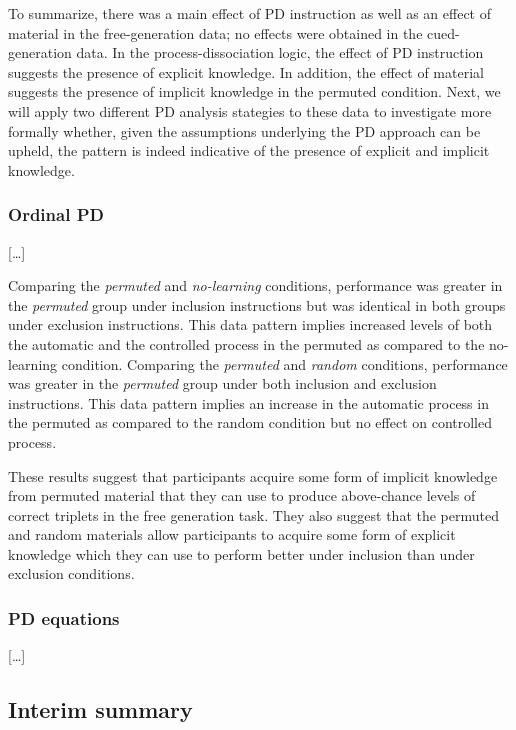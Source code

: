 \documentclass[
  english,
  man]{apa6}
\begin{document}
To summarize, there was a main effect of PD instruction as well as an effect of material in the free-generation data; no effects were obtained in the cued-generation data.
In the process-dissociation logic, the effect of PD instruction suggests the presence of explicit knowledge.
In addition, the effect of material suggests the presence of implicit knowledge in the permuted condition.
Next, we will apply two different PD analysis stategies to these data to investigate more formally whether, given the assumptions underlying the PD approach can be upheld, the pattern is indeed indicative of the presence of explicit and implicit knowledge.

\hypertarget{ordinal-pd}{%
\subsubsection{Ordinal PD}\label{ordinal-pd}}

{[}\ldots{]}

Comparing the \emph{permuted} and \emph{no-learning} conditions, performance was greater in the \emph{permuted} group under inclusion instructions but was identical in both groups under exclusion instructions.
This data pattern implies increased levels of both the automatic and the controlled process in the permuted as compared to the no-learning condition.
Comparing the \emph{permuted} and \emph{random} conditions, performance was greater in the \emph{permuted} group under both inclusion and exclusion instructions.
This data pattern implies an increase in the automatic process in the permuted as compared to the random condition but no effect on controlled process.

These results suggest that participants acquire some form of implicit knowledge from permuted material that they can use to produce above-chance levels of correct triplets in the free generation task. They also suggest that the permuted and random materials allow participants to acquire some form of explicit knowledge which they can use to perform better under inclusion than under exclusion conditions.

\hypertarget{pd-equations}{%
\subsubsection{PD equations}\label{pd-equations}}

{[}\ldots{]}

\hypertarget{interim-summary}{%
\subsection{Interim summary}\label{interim-summary}}
\end{document}

